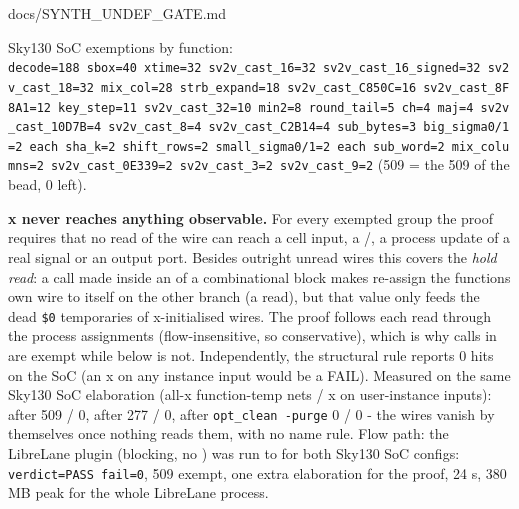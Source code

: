 \begin{relocated}{docs/SYNTH_UNDEF_GATE.md}
{}

Sky130 SoC exemptions by function:
\texttt{decode=\allowbreak{}188\ sbox=\allowbreak{}40\ xtime=\allowbreak{}32\ sv2v\_\allowbreak{}cast\_\allowbreak{}16=\allowbreak{}32\ sv2v\_\allowbreak{}cast\_\allowbreak{}16\_\allowbreak{}signed=\allowbreak{}32\ sv2v\_\allowbreak{}cast\_\allowbreak{}18=\allowbreak{}32\ mix\_\allowbreak{}col=\allowbreak{}28\ strb\_\allowbreak{}expand=\allowbreak{}18\ sv2v\_\allowbreak{}cast\_\allowbreak{}C850C=\allowbreak{}16\ sv2v\_\allowbreak{}cast\_\allowbreak{}8F8A1=\allowbreak{}12\ key\_\allowbreak{}step=\allowbreak{}11\ sv2v\_\allowbreak{}cast\_\allowbreak{}32=\allowbreak{}10\ min2=\allowbreak{}8\ round\_\allowbreak{}tail=\allowbreak{}5\ ch=\allowbreak{}4\ maj=\allowbreak{}4\ sv2v\_\allowbreak{}cast\_\allowbreak{}10D7B=\allowbreak{}4\ sv2v\_\allowbreak{}cast\_\allowbreak{}8=\allowbreak{}4\ sv2v\_\allowbreak{}cast\_\allowbreak{}C2B14=\allowbreak{}4\ sub\_\allowbreak{}bytes=\allowbreak{}3\ big\_\allowbreak{}sigma0/\allowbreak{}1=\allowbreak{}2\ each\ sha\_\allowbreak{}k=\allowbreak{}2\ shift\_\allowbreak{}rows=\allowbreak{}2\ small\_\allowbreak{}sigma0/\allowbreak{}1=\allowbreak{}2\ each\ sub\_\allowbreak{}word=\allowbreak{}2\ mix\_\allowbreak{}columns=\allowbreak{}2\ sv2v\_\allowbreak{}cast\_\allowbreak{}0E339=\allowbreak{}2\ sv2v\_\allowbreak{}cast\_\allowbreak{}3=\allowbreak{}2\ sv2v\_\allowbreak{}cast\_\allowbreak{}9=\allowbreak{}2}
(509 = the 509 of the bead, 0 left).

\textbf{x never reaches anything observable.} For every exempted group
the proof requires that no read of the wire can reach a cell input, a
/, a process update of a real signal or an
output port. Besides outright unread wires this covers the \emph{hold
read}: a call made inside an  of a combinational block makes
 re-assign the function\textquotesingle s own wire to itself
on the other branch (a read), but that value only feeds the dead
\texttt{\$0} temporaries of x-initialised wires. The proof follows each
read through the process assignments (flow-insensitive, so
conservative), which is why  calls in
 are exempt while  below is not.
Independently, the structural rule 
reports 0 hits on the SoC (an x on any instance input would be a FAIL).
Measured on the same Sky130 SoC elaboration (all-x function-temp nets /
x on user-instance inputs): after  509 / 0, after
 277 / 0, after
\texttt{opt\_\allowbreak{}clean\ -\allowbreak{}purge} 0 / 0 - the wires
vanish by themselves once nothing reads them, with no name rule. Flow
path: the LibreLane plugin (blocking, no ) was run
to  for both Sky130 SoC configs:
\texttt{verdict=\allowbreak{}PASS\ fail=\allowbreak{}0}, 509 exempt, one
extra elaboration for the proof, 24 s, 380 MB peak for the whole
LibreLane process.


\end{relocated}
